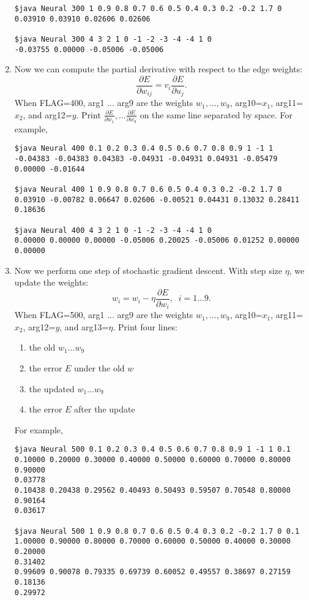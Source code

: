 \documentclass{article}
\begin{document}
\begin{enumerate}
\begin{verbatim}
$java Neural 300 1 0.9 0.8 0.7 0.6 0.5 0.4 0.3 0.2 -0.2 1.7 0
0.03910 0.03910 0.02606 0.02606

$java Neural 300 4 3 2 1 0 -1 -2 -3 -4 -4 1 0
-0.03755 0.00000 -0.05006 -0.05006
\end{verbatim}

\item
Now we can compute the partial derivative with respect to the edge weights:
$$\frac{\partial E}{\partial w_{ij}} = v_i \frac{\partial E}{\partial u_j}.$$
When FLAG=400, arg1 ... arg9 are the weights $w_1, \ldots, w_9$, arg10=$x_1$, arg11=$x_2$, and arg12=$y$.
Print $\frac{\partial E}{\partial w_1}, \ldots \frac{\partial E}{\partial w_9}$ 
on the same line separated by space. 
For example,
\begin{verbatim}
$java Neural 400 0.1 0.2 0.3 0.4 0.5 0.6 0.7 0.8 0.9 1 -1 1
-0.04383 -0.04383 0.04383 -0.04931 -0.04931 0.04931 -0.05479 0.00000 -0.01644

$java Neural 400 1 0.9 0.8 0.7 0.6 0.5 0.4 0.3 0.2 -0.2 1.7 0
0.03910 -0.00782 0.06647 0.02606 -0.00521 0.04431 0.13032 0.28411 0.18636

$java Neural 400 4 3 2 1 0 -1 -2 -3 -4 -4 1 0
0.00000 0.00000 0.00000 -0.05006 0.20025 -0.05006 0.01252 0.00000 0.00000
\end{verbatim}

\item
Now we perform one step of stochastic gradient descent.  With step size $\eta$, we update the weights:
$$w_i = w_i - \eta \frac{\partial E}{\partial w_i}, \;\; i=1\ldots 9.$$
When FLAG=500, arg1 ... arg9 are the weights $w_1, \ldots, w_9$, arg10=$x_1$, arg11=$x_2$, arg12=$y$, and arg13=$\eta$.
Print four lines:
\begin{enumerate}
\item the old $w_1 \ldots w_9$
\item the error $E$ under the old $w$
\item the updated $w_1 \ldots w_9$
\item the error $E$ after the update
\end{enumerate}
For example,
\begin{verbatim}
$java Neural 500 0.1 0.2 0.3 0.4 0.5 0.6 0.7 0.8 0.9 1 -1 1 0.1
0.10000 0.20000 0.30000 0.40000 0.50000 0.60000 0.70000 0.80000 0.90000
0.03778
0.10438 0.20438 0.29562 0.40493 0.50493 0.59507 0.70548 0.80000 0.90164
0.03617

$java Neural 500 1 0.9 0.8 0.7 0.6 0.5 0.4 0.3 0.2 -0.2 1.7 0 0.1
1.00000 0.90000 0.80000 0.70000 0.60000 0.50000 0.40000 0.30000 0.20000
0.31402
0.99609 0.90078 0.79335 0.69739 0.60052 0.49557 0.38697 0.27159 0.18136
0.29972


\end{verbatim}
\end{enumerate}
\end{document}
